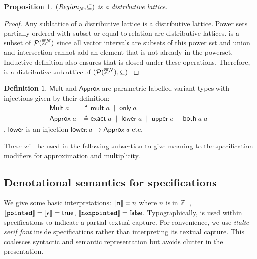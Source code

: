\documentclass[acmlarge,review]{acmart}
\theoremstyle{definition}
\newtheorem{defn}{Definition}
\theoremstyle{plain}
\newtheorem{prop}{Proposition}
\theoremstyle{remark}
\begin{document}
\begin{prop}{}
  $(\textnormal{$\textit{Region}_{N}$},\subseteq)$ is a distributive lattice.
\end{prop}
%
\begin{proof}
  Any sublattice of a distributive lattice is a distributive lattice. Power sets
  partially ordered with subset or equal to relation are distributive lattices.
   is a subset of $\mathcal{P}{(\textnormal{$\overline{\mathbb{Z}}$}{}^{\mkern0mu{N}})}$ since all
  vector intervals are subsets of this power set and union and intersection
  cannot add an element that is not already in the powerset.  Inductive
  definition also ensures that  is closed under these operations.
  Therefore,  is a distributive sublattice of
  $(\mathcal{P}{(\textnormal{$\overline{\mathbb{Z}}$}{}^{\mkern0mu{N}})}, \subseteq)$.
\end{proof}

\begin{defn}{}
  $\mathsf{Mult}$ and $\mathsf{Approx}$ are parametric labelled variant types
  with injections given by their definition:
%
  \begin{align*}
    \mathsf{Mult} \; a &
      \triangleq \mathsf{mult} \; a \;\mid\; \mathsf{only} \; a \\
    \mathsf{Approx} \; a &
      \triangleq \mathsf{exact} \; a \;\mid\; \mathsf{lower} \; a \;\mid\;
        \mathsf{upper} \; a \;\mid\; \mathsf{both} \; a \; a
  \end{align*}
%
  \eg{}, $\mathsf{lower}$ is an injection $\mathsf{lower} : a \to \mathsf{Approx}
  \; a$ etc.

  These will be used in the following subsection to give meaning to the
  specification modifiers for approximation and multiplicity.
\end{defn}

\subsection{Denotational semantics for specifications}

We give some basic interpretations: $\llbracket{} {\texttt{n}} \rrbracket{} = n$ where $n$ is in
$\mathbb{Z}^+$, $\llbracket{} {\texttt{pointed}} \rrbracket{} = \llbracket \epsilon \rrbracket =
\mathsf{true}$, $\llbracket{} {\texttt{nonpointed}} \rrbracket{} = \mathsf{false}$.
Typographically,  is used within specifications
to indicate a partial textual capture. For convenience, we use \textit{italic
serif font} inside specifications rather than interpreting its textual capture.
This coalesces syntactic and semantic representation but avoids clutter in the
presentation.
\end{document}

